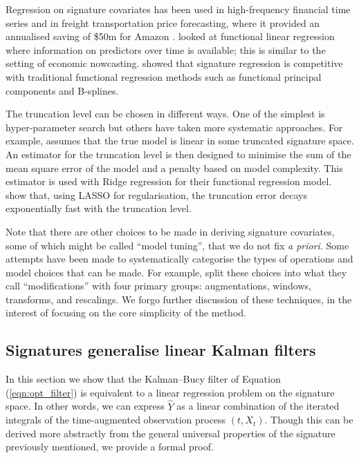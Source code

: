 \documentclass[a4paper, 12pt]{article}
\theoremstyle{remark}
\begin{document}
Regression on signature covariates has been used in high-frequency financial time series \citep{lyons2014afeature, levin2013learning} and in freight transportation price forecasting, where it provided an annualised saving of \$50m for Amazon \citep{gu2024transportation}. \citet{fermanian2020linear} looked at functional linear regression where information on predictors over time is available; this is similar to the setting of economic nowcasting. \citet{fermanian2020linear} showed that signature regression is competitive with traditional functional regression methods such as functional principal components and B-splines.

The truncation level can be chosen in different ways. One of the simplest is hyper-parameter search \citep{morrill2021neuralrough} but others have taken more systematic approaches. For example, \citet{fermanian2020linear} assumes that the true model is linear in some truncated signature space. An estimator for the truncation level is then designed to minimise the sum of the mean square error of the model and a penalty based on model complexity. This estimator is used with Ridge regression for their functional regression model. \citet{bleistein2023learning} show that, using LASSO for regularisation, the truncation error decays exponentially fast with the truncation level.

Note that there are other choices to be made in deriving signature covariates, some of which might be called ``model tuning'', that we do not fix \textit{a priori}. Some attempts have been made to systematically categorise the types of operations and model choices that can be made. For example, \citet{morrill2021generalised} split these choices into what they call ``modifications'' with four primary groups: augmentations, windows, transforms, and rescalings.
We forgo further discussion of these techniques, in the interest of focusing on the core simplicity of the method.

\subsection{Signatures generalise linear Kalman filters}\label{sec:signKalman}
In this section we show that the Kalman--Bucy filter of Equation (\ref{eqn:opt_filter}) is equivalent to a linear regression problem on the signature space. In other words, we can express $\hat Y$ as a linear combination of the iterated integrals of the time-augmented observation process $(t, X_t)$. Though this can be derived more abstractly from the general universal properties of the signature previously mentioned, we provide a formal proof.
\end{document}
